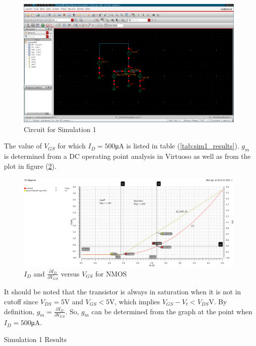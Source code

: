 \FloatBarrier

\begin{figure}[h!]
	\centering
	\includegraphics[scale=0.3]{./images/circuit1.PNG}
	\caption{Circuit for Simulation 1}
	\label{fig:circuit1}
\end{figure}

\FloatBarrier

The value of $V_{GS}$ for which $I_{D} = 500$\si{\micro\ampere} is listed in table (\ref{tab:sim1_results}).
$g_{m}$ is determined from a DC operating point analysis in Virtuoso as well as from the plot in figure (\ref{fig:id_vs_vgs}).

\FloatBarrier

\begin{figure}[h!]
	\centering
	\includegraphics[scale=0.45]{./images/500ua_point.PNG}
	\caption{$I_{D}$ and $\frac{\partial I_{D}}{\partial V_{GS}}$ versus $V_{GS}$ for NMOS}
	\label{fig:id_vs_vgs}
\end{figure}

\FloatBarrier

It should be noted that the transistor is always in saturation when it is not in cutoff since $V_{DS} = 5$\si{\volt} and $V_{GS} < 5$\si{\volt}, which implies $V_{GS} - V_{t} < V_{DS}$\si{\volt}.
By definition, $g_{m} = \frac{\partial I_{D}}{\partial V_{GS}}$.
So, $g_{m}$ can be determined from the graph at the point when $I_{D} = 500$\si{\micro\ampere}.

\FloatBarrier

\begin{table}[h!]
	\centering
	\caption{Simulation 1 Results}
	\label{tab:sim1_results}
\end{table}

\FloatBarrier
